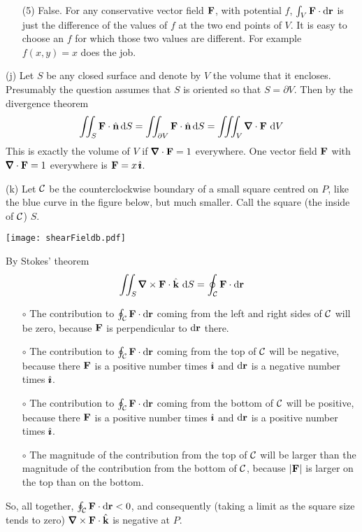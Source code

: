 \begin{solution}
\begin{itemize}
\item[(5)] False. For any conservative vector field $\mathbf{F}$, with potential $f$,
$\int_V \mathbf{F}\cdot\mathrm{d}\mathbf{r}$ is just the difference of the values of $f$ at 
the two end points of $V$. It is easy to choose an $f$ for which those
two values are different. For example $f(x,y)=x$ does the job.


\end{itemize} 

\noindent (j)
Let $S$ be any closed surface and denote by $V$ the 
volume that it encloses. Presumably  the question assumes that
$S$ is oriented so that $S=\partial V$. Then by the divergence 
theorem
\begin{equation*}
\dblInt_S \vF \cdot \hn\,\dee{S}
=\dblInt_{\partial V} \vF \cdot \hn\,\dee{S}
=\tripInt_V \vnabla\cdot\vF\ \dee{V}
\end{equation*}
This is exactly the volume of $V$ if $\vnabla\cdot\vF=1$
everywhere. One vector field $\mathbf{F}$ with $\vnabla\cdot\vF=1$
everywhere is $\mathbf{F}=x\,\hat{\pmb{\imath}}$.

\noindent (k)
Let $\mathcal{C}$ be the counterclockwise boundary of a small square centred
on $P$, like the blue curve in the figure below, but much smaller. 
Call the square (the inside of $\mathcal{C}$) $S$.

  \begin{center}
       \texttt{[image: shearFieldb.pdf]}
  \end{center}

By Stokes' theorem
\begin{equation*}
\dblInt_S \vnabla\times\vF\cdot\hk\ \dee{S}
=\oint_\cC \vF\cdot\dee{\vr}
\end{equation*}
\begin{itemize}\itemsep1pt \parskip0pt  %
\item[$\circ$]
The contribution to $\oint_{\mathcal{C}} \mathbf{F}\cdot\mathrm{d}\mathbf{r}$ coming from the left and
right sides of $\mathcal{C}$ will be zero, because $\mathbf{F}$ is perpendicular 
to $\mathrm{d}\mathbf{r}$ there. 
\item[$\circ$]
The contribution to $\oint_{\mathcal{C}} \mathbf{F}\cdot\mathrm{d}\mathbf{r}$ coming from the
top of $\mathcal{C}$ will be negative, because there $\mathbf{F}$ is a positive number times
$\hat{\pmb{\imath}}$ and $\mathrm{d}\mathbf{r}$ is a negative number times $\hat{\pmb{\imath}}$.
\item[$\circ$]
The contribution to $\oint_{\mathcal{C}} \mathbf{F}\cdot\mathrm{d}\mathbf{r}$ coming from the
bottom of $\mathcal{C}$ will be positive, because there $\mathbf{F}$ is a positive 
number times $\hat{\pmb{\imath}}$ and $\mathrm{d}\mathbf{r}$ is a positive number times $\hat{\pmb{\imath}}$.
\item[$\circ$]
The magnitude of the contribution from the top of $\mathcal{C}$ will be
larger than the magnitude of the contribution from the bottom of $\mathcal{C}$,
because $|\mathbf{F}|$ is larger on the top than on the bottom.
\end{itemize} 
So, all together, $\oint_{\mathcal{C}} \mathbf{F}\cdot\mathrm{d}\mathbf{r}<0$, and consequently
(taking a limit as the square size tends to zero)
$\vnabla\times\vF\cdot\hk$ is negative at $P$.

\end{solution}

